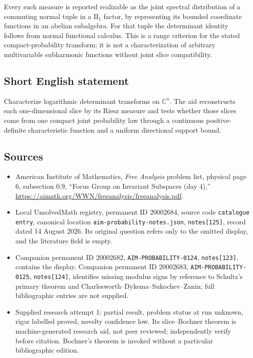 \documentclass[11pt]{article}
\newcommand{\C}{\mathbb{C}}
\begin{document}
Every such measure is reported realizable as the joint spectral distribution of a commuting normal tuple in a $\mathrm{II}_1$ factor, by representing its bounded coordinate functions in an abelian subalgebra. For that tuple the determinant identity follows from normal functional calculus. This is a range criterion for the stated compact-probability transform; it is not a characterization of arbitrary multivariable subharmonic functions without joint slice compatibility.
\subsection{Short English statement}
Characterize logarithmic determinant transforms on $\C^n$. The aid reconstructs each one-dimensional slice by its Riesz measure and tests whether those slices come from one compact joint probability law through a continuous positive-definite characteristic function and a uniform directional support bound.
\subsection{Sources}
\begin{itemize}
\item American Institute of Mathematics, \emph{Free Analysis} problem list, physical page 6, subsection 0.9, ``Focus Group on Invariant Subspaces (day 4),'' \url{https://aimath.org/WWN/freeanalysis/freeanalysis.pdf}.
\item Local UnsolvedMath registry, permanent ID 20002684, source code \texttt{catalogue entry}, canonical location \texttt{aim-probability-notes.json}, \texttt{notes[125]}, record dated 14 August 2026. Its original question refers only to the omitted display, and the literature field is empty.
\item Companion permanent ID 20002682, \texttt{AIM-PROBABILITY-0124}, \texttt{notes[123]}, contains the display. Companion permanent ID 20002683, \texttt{AIM-PROBABILITY-0125}, \texttt{notes[124]}, identifies missing modulus signs by reference to Schultz's primary theorem and Charlesworth--Dykema--Sukochev--Zanin; full bibliographic entries are not supplied.
\item Supplied research attempt 1: partial result, problem status at run unknown, rigor labelled proved, novelty confidence low. Its slice--Bochner theorem is machine-generated research aid, not peer reviewed; independently verify before citation. Bochner's theorem is invoked without a particular bibliographic edition.
\end{itemize}
\end{document}

